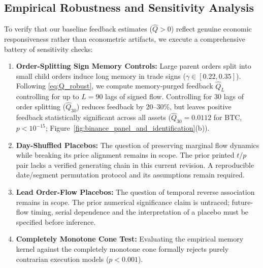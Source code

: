 \documentclass[12pt]{article}
\theoremstyle{definition}
\theoremstyle{remark}
\begin{document}
\subsection{Empirical Robustness and Sensitivity Analysis}
To verify that our baseline feedback estimates ($\hat{Q} > 0$) reflect genuine economic responsiveness rather than econometric artifacts, we execute a comprehensive battery of sensitivity checks:

\begin{enumerate}[noitemsep,topsep=1pt]
    \item \textbf{Order-Splitting Sign Memory Controls:} Large parent orders split into small child orders induce long memory in trade signs ($\gamma \in [0.22, 0.35]$). Following \eqref{eq:Q_robust}, we compute memory-purged feedback $\hat{Q}_L$ controlling for up to $L=90$ lags of signed flow. Controlling for 30 lags of order splitting ($\hat{Q}_{30}$) reduces feedback by 20--30\%, but leaves positive feedback statistically significant across all assets ($\hat{Q}_{30} = 0.0112$ for BTC, $p < 10^{-15}$; Figure~\ref{fig:binance_panel_and_identification}(b)).
    \item \textbf{Day-Shuffled Placebos:} The question of preserving marginal flow dynamics while breaking its price alignment remains in scope. The prior printed $t/p$ pair lacks a verified generating chain in this current revision. A reproducible date/segment permutation protocol and its assumptions remain required.
    \item \textbf{Lead Order-Flow Placebos:} The question of temporal reverse association remains in scope. The prior numerical significance claim is untraced; future-flow timing, serial dependence and the interpretation of a placebo must be specified before inference.
    \item \textbf{Completely Monotone Cone Test:} Evaluating the empirical memory kernel against the completely monotone cone formally rejects purely contrarian execution models ($p < 0.001$).
\end{enumerate}
\end{document}
